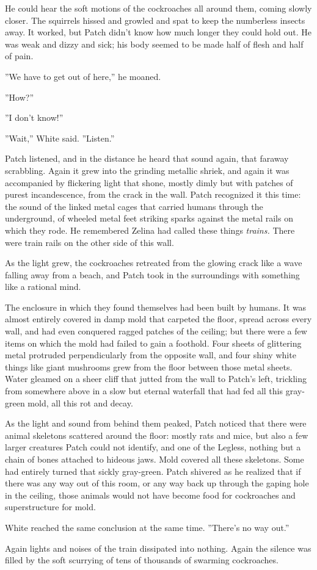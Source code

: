 \documentclass[12pt]{book}
\begin{document}
 He could hear the soft motions of the cockroaches all around them, coming slowly closer. The squirrels hissed and growled and spat to keep the numberless insects away. It worked, but Patch didn't know how much longer they could hold out. He was weak and dizzy and sick; his body seemed to be made half of flesh and half of pain.\par
 ''We have to get out of here,'' he moaned.\par
 ''How?''\par
 ''I don't know!''\par
 ''Wait,'' White said. ''Listen.''\par
 Patch listened, and in the distance he heard that sound again, that faraway scrabbling. Again it grew into the grinding metallic shriek, and again it was accompanied by flickering light that shone, mostly dimly but with patches of purest incandescence, from the crack in the wall. Patch recognized it this time: the sound of the linked metal cages that carried humans through the underground, of wheeled metal feet striking sparks against the metal rails on which they rode. He remembered Zelina had called these things {\it trains.} There were train rails on the other side of this wall.\par
 As the light grew, the cockroaches retreated from the glowing crack like a wave falling away from a beach, and Patch took in the surroundings with something like a rational mind.\par
The enclosure in which they found themselves had been built by humans. It was almost entirely covered in damp mold that carpeted the floor, spread across every wall, and had even conquered ragged patches of the ceiling; but there were a few items on which the mold had failed to gain a foothold. Four sheets of glittering metal protruded perpendicularly from the opposite wall, and four shiny white things like giant mushrooms grew from the floor between those metal sheets. Water gleamed on a sheer cliff that jutted from the wall to Patch's left, trickling from somewhere above in a slow but eternal waterfall that had fed all this gray-green mold, all this rot and decay.\par
 As the light and sound from behind them peaked, Patch noticed that there were animal skeletons scattered around the floor: mostly rats and mice, but also a few larger creatures Patch could not identify, and one of the Legless, nothing but a chain of bones attached to hideous jaws. Mold covered all these skeletons. Some had entirely turned that sickly gray-green. Patch shivered as he realized that if there was any way out of this room, or any way back up through the gaping hole in the ceiling, those animals would not have become food for cockroaches and superstructure for mold.\par
 White reached the same conclusion at the same time. ''There's no way out.''\par
 Again lights and noises of the train dissipated into nothing. Again the silence was filled by the soft scurrying of tens of thousands of swarming cockroaches.\par
\end{document}
